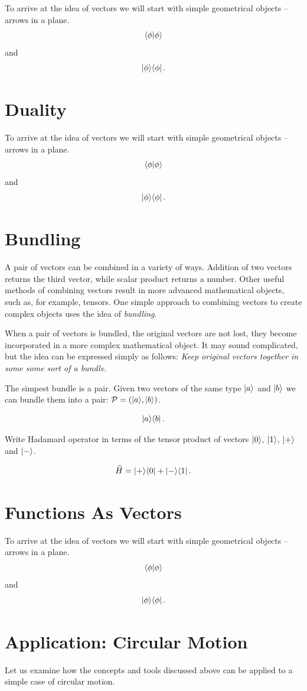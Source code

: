 To arrive at the idea of vectors we will start with simple geometrical
objects -- arrows in a plane.
\[
\langle{\phi}|{\phi\rangle}
\]
and
\[
|{\phi}\rangle\langle{\phi}|\,.
\]

\section{Duality}

To arrive at the idea of vectors we will start with simple geometrical
objects -- arrows in a plane.
\[
\langle{\phi}|{\phi\rangle}
\]
and
\[
|{\phi}\rangle\langle{\phi}|\,.
\]


\section{Bundling}
A pair of vectors can be combined in a variety of ways. Addition of two vectors returns the third vector, while scalar product returns a number. Other useful methods of combining vectors result in more advanced mathematical objects, such as, for example, tensors. One simple approach to combining vectors to create complex objects uses the idea of \emph{bundling}.

When a pair of vectors is bundled, the original vectors are not lost, they become incorporated in a more complex mathematical object. It may sound complicated, but the idea can be expressed simply as follows: \emph{Keep original vectors together in some some sort of a bundle.}

The simpest bundle is a pair. Given two vectors of the same type $|{a}\rangle$ and $|{b}\rangle$ we can bundle them into a pair: $\mathcal{P}=(|{a}\rangle, |{b}\rangle)$.

\[
|{a}\rangle\langle{b}|\,.
\]
\begin{exercise}
	Write Hadamard operator in terms of the tensor product of vectors $|{0}\rangle$, $|{1}\rangle$, $|{+}\rangle$ and $|{-}\rangle$.
	
	\[
	\widehat{H} = |{+}\rangle\langle{0}|+|{-}\rangle\langle{1}|\,.
	\]
\end{exercise}

\section{Functions As Vectors}

To arrive at the idea of vectors we will start with simple geometrical
objects -- arrows in a plane.
\[
\langle{\phi}|{\phi\rangle}
\]
and
\[
|{\phi}\rangle\langle{\phi}|\,.
\]

\section{Application: Circular Motion}
Let us examine how the concepts and tools discussed above can be applied to a simple case of circular motion.  

